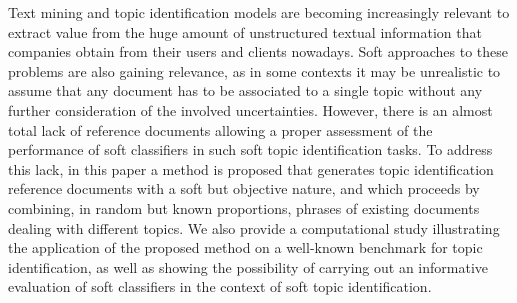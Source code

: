 
Text mining and topic identification models are becoming increasingly relevant to extract value from the huge amount of unstructured textual information that companies obtain from their users and clients nowadays. Soft approaches to these problems are also gaining relevance, as in some contexts it may be unrealistic to assume that any document has to be associated to a single topic without any further consideration of the involved uncertainties. However, there is an almost total lack of reference documents allowing a proper assessment of the performance of soft classifiers in such soft topic identification tasks. To address this lack, in this paper a method is proposed that generates topic identification reference documents with a soft but objective nature, and which proceeds by combining, in random but known proportions, phrases of existing documents dealing with different topics. We also provide a computational study illustrating the application of the proposed method on a well-known benchmark for topic identification, as well as showing the possibility of carrying out an informative evaluation of soft classifiers in the context of soft topic identification.


